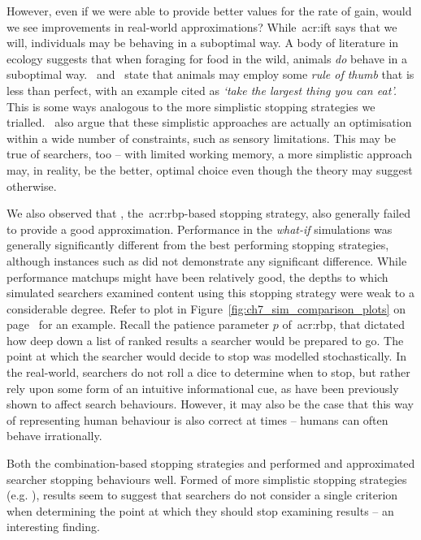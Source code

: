 However, even if we were able to provide better values for the rate of gain, would we see improvements in real-world approximations? While~\gls{acr:ift} says that we will, individuals may be behaving in a suboptimal way. A body of literature in ecology suggests that when foraging for food in the wild, animals \emph{do} behave in a suboptimal way.~\cite{janetos1981imperfectly} and~\cite{krebs1983perspectives} state that animals may employ some \emph{rule of thumb} that is less than perfect, with an example cited as \emph{`take the largest thing you can eat'.} This is some ways analogous to the more simplistic stopping strategies we trialled.~\cite{krebs1983perspectives} also argue that these simplistic approaches are actually an optimisation within a wide number of constraints, such as sensory limitations. This may be true of searchers, too -- with limited working memory, a more simplistic approach may, in reality, be the better, optimal choice even though the theory may suggest otherwise.

We also observed that , the~\gls{acr:rbp}-based stopping strategy, also generally failed to provide a good approximation. Performance in the \emph{what-if} simulations was generally significantly different from the best performing stopping strategies, although instances such as  did not demonstrate any significant difference. While performance matchups might have been relatively good, the depths to which simulated searchers examined content using this stopping strategy were weak to a considerable degree. Refer to plot  in Figure~\ref{fig:ch7_sim_comparison_plots} on page~\pageref{fig:ch7_sim_comparison_plots} for an example. Recall the patience parameter $p$ of~\gls{acr:rbp}, that dictated how deep down a list of ranked results a searcher would be prepared to go. The point at which the searcher would decide to stop was modelled stochastically. In the real-world, searchers do not roll a dice to determine when to stop, but rather rely upon some form of an intuitive informational cue, as have been previously shown to affect search behaviours. However, it may also be the case that this way of representing human behaviour is also correct at times -- humans can often behave irrationally.

Both the combination-based stopping strategies  and  performed and approximated searcher stopping behaviours well. Formed of more simplistic stopping strategies (e.g. ), results seem to suggest that searchers do not consider a single criterion when determining the point at which they should stop examining results -- an interesting finding.


